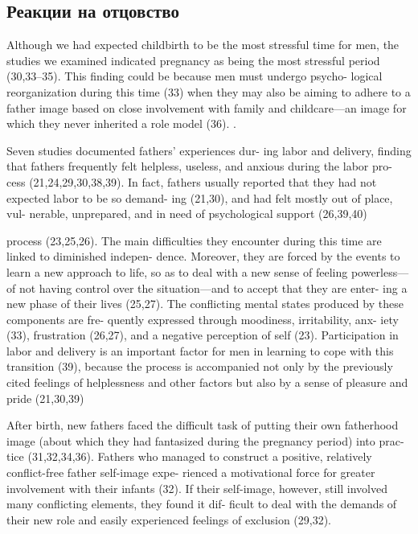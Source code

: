 \documentclass{../../common/thesisbyxetex}
\begin{document}
 
\subsection{Реакции на отцовство}

Although we had expected childbirth to be the most
stressful time for men, the studies we examined indicated
pregnancy as being the most stressful period (30,33–35).
This finding could be because men must undergo psycho-
logical reorganization during this time (33) when they
may also be aiming to adhere to a father image based
on close involvement with family and childcare—an
image for which they never inherited a role model (36).
 \cite[313]{flit}.


 Seven studies documented fathers’ experiences dur-
ing labor and delivery, finding that fathers frequently
felt helpless, useless, and anxious during the labor pro-
cess (21,24,29,30,38,39). In fact, fathers usually reported
that they had not expected labor to be so demand-
ing (21,30), and had felt mostly out of place, vul-
nerable, unprepared, and in need of psychological
support (26,39,40)\cite[313]{flit}


process (23,25,26). The main difficulties they encounter
during this time are linked to diminished indepen-
dence. Moreover, they are forced by the events to
learn a new approach to life, so as to deal with a
new sense of feeling powerless—of not having control
over the situation—and to accept that they are enter-
ing a new phase of their lives (25,27). The conflicting
mental states produced by these components are fre-
quently expressed through moodiness, irritability, anx-
iety (33), frustration (26,27), and a negative perception
of self (23). Participation in labor and delivery is an
important factor for men in learning to cope with this
transition (39), because the process is accompanied not
only by the previously cited feelings of helplessness
and other factors but also by a sense of pleasure and
pride (21,30,39) \cite[314]{flit}


After birth, new fathers faced the difficult task of
putting their own fatherhood image (about which they
had fantasized during the pregnancy period) into prac-
tice (31,32,34,36). Fathers who managed to construct a
positive, relatively conflict-free father self-image expe-
rienced a motivational force for greater involvement
with their infants (32). If their self-image, however, still
involved many conflicting elements, they found it dif-
ficult to deal with the demands of their new role and
easily experienced feelings of exclusion (29,32).\cite[314]{flit}
\end{document}
